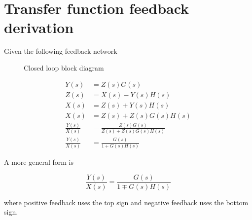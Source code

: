 \section{Transfer function feedback derivation}
\label{sec:app-tf-feedback-deriv}

Given the following feedback network

\begin{figure}[H]
  \centering


  \caption{Closed loop block diagram}
  \label{fig:closed_loop_deriv}
\end{figure}

\begin{align}
  Y(s) &= Z(s) G(s) \nonumber \\
  Z(s) &= X(s) - Y(s) H(s) \nonumber \\
  X(s) &= Z(s) + Y(s) H(s) \nonumber \\
  X(s) &= Z(s) + Z(s) G(s) H(s) \nonumber \\
  \frac{Y(s)}{X(s)} &= \frac{Z(s) G(s)}{Z(s) + Z(s) G(s) H(s)} \nonumber \\
  \frac{Y(s)}{X(s)} &= \frac{G(s)}{1 + G(s) H(s)}
\end{align}

A more general form is

\begin{equation}
  \frac{Y(s)}{X(s)} = \frac{G(s)}{1 \mp G(s) H(s)}
\end{equation}

where positive feedback uses the top sign and negative feedback uses the bottom
sign.
